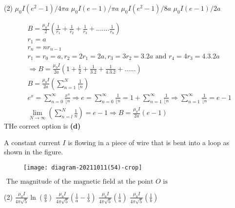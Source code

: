 \begin{enumerate}
\begin{tasks}(2)
	\task[\textbf{A.}] $\mu_{0} I\left(e^{2}-1\right) / 4 \pi a$
	\task[\textbf{B.}]$\mu_{0} I(e-1) / \pi a$
	\task[\textbf{C.}]$\mu_{0} I\left(e^{2}-1\right) / 8 a$
	\task[\textbf{D.}]$\mu_{0} I(e-1) / 2 a$
\end{tasks}
\begin{answer}
	\begin{align*}
	&B=\frac{\mu_{0} I}{2}\left(\frac{1}{r_{1}}+\frac{1}{r_{2}}+\frac{1}{r_{3}}+\ldots \ldots . \frac{1}{r_{n}}\right)\\
	&r_{1}=a \\
	&r_{n}=n r_{n-1} \\
	&r_{1}=r_{0}=a, r_{2}=2 r_{1}=2 a, r_{3}=3 r_{2}=3.2 a \text { and } r_{4}=4 r_{3}=4.3 .2 a \\
	&\Rightarrow B=\frac{\mu_{0} I}{2 a}\left(1+\frac{1}{2}+\frac{1}{3.2}+\frac{1}{4.3 .2}+\ldots \ldots\right) \\
	&B=\frac{\mu_{0} I}{2 a}\left(\sum_{n=1}^{N} \frac{1}{\lfloor n}\right) \\
	&e^{x}=\sum_{n=0}^{\infty} \frac{x^{n}}{\lfloor n} \Rightarrow e=\sum_{n=0}^{\infty} \frac{1}{\lfloor n}=1+\sum_{n=1}^{\infty} \frac{1}{\lfloor n} \Rightarrow \sum_{n=1}^{\infty} \frac{1}{\lfloor n}=e-1 \\
	&\lim _{N \rightarrow \infty}\left(\sum_{n=l}^{N} \frac{1}{n}\right)=e-1 \Rightarrow B=\frac{\mu_{0} I}{2 a}(e-1)
	\end{align*}	
	THe correct option is \textbf{(d)}
\end{answer}
\begin{minipage}{\textwidth}
	\item A constant current $I$ is flowing in a piece of wire that is bent into a loop as shown in the figure.\\
	\begin{figure}[H]
		\centering
		\texttt{[image: diagram-20211011(54)-crop]}
	\end{figure}
	$\text { The magnitude of the magnetic field at the point } O \text { is }$
\end{minipage}
\begin{tasks}(2)
	\task[\textbf{A.}] $\frac{\mu_{0} I}{4 \pi \sqrt{5}} \ln \left(\frac{a}{b}\right)$
	\task[\textbf{B.}]$\frac{\mu_{0} I}{4 \pi \sqrt{5}}\left(\frac{1}{a}-\frac{1}{b}\right)$
	\task[\textbf{C.}]$\frac{\mu_{0} I}{4 \pi \sqrt{5}}\left(\frac{1}{a}\right)$
	\task[\textbf{D.}]$\frac{\mu_{0} I}{4 \pi \sqrt{5}}\left(\frac{1}{b}\right)$
\end{tasks}

\end{enumerate}
